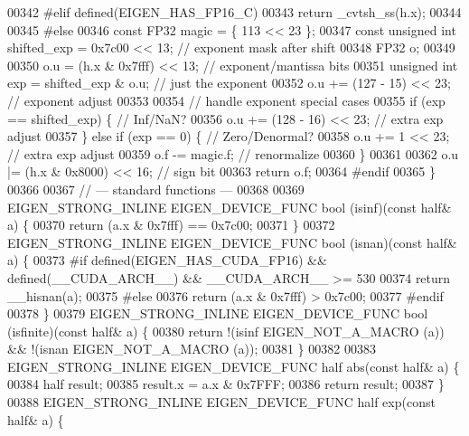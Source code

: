\begin{DoxyCode}
00342 \textcolor{preprocessor}{#elif defined(EIGEN\_HAS\_FP16\_C)}
00343   \textcolor{keywordflow}{return} \_cvtsh\_ss(h.x);
00344 
00345 \textcolor{preprocessor}{#else}
00346   \textcolor{keyword}{const} FP32 magic = \{ 113 << 23 \};
00347   \textcolor{keyword}{const} \textcolor{keywordtype}{unsigned} \textcolor{keywordtype}{int} shifted\_exp = 0x7c00 << 13; \textcolor{comment}{// exponent mask after shift}
00348   FP32 o;
00349 
00350   o.u = (h.x & 0x7fff) << 13;             \textcolor{comment}{// exponent/mantissa bits}
00351   \textcolor{keywordtype}{unsigned} \textcolor{keywordtype}{int} exp = shifted\_exp & o.u;   \textcolor{comment}{// just the exponent}
00352   o.u += (127 - 15) << 23;                \textcolor{comment}{// exponent adjust}
00353 
00354   \textcolor{comment}{// handle exponent special cases}
00355   \textcolor{keywordflow}{if} (exp == shifted\_exp) \{     \textcolor{comment}{// Inf/NaN?}
00356     o.u += (128 - 16) << 23;    \textcolor{comment}{// extra exp adjust}
00357   \} \textcolor{keywordflow}{else} \textcolor{keywordflow}{if} (exp == 0) \{        \textcolor{comment}{// Zero/Denormal?}
00358     o.u += 1 << 23;             \textcolor{comment}{// extra exp adjust}
00359     o.f -= magic.f;             \textcolor{comment}{// renormalize}
00360   \}
00361 
00362   o.u |= (h.x & 0x8000) << 16;    \textcolor{comment}{// sign bit}
00363   \textcolor{keywordflow}{return} o.f;
00364 \textcolor{preprocessor}{#endif}
00365 \}
00366 
00367 \textcolor{comment}{// --- standard functions ---}
00368 
00369 EIGEN\_STRONG\_INLINE EIGEN\_DEVICE\_FUNC bool (isinf)(\textcolor{keyword}{const} half& a) \{
00370   \textcolor{keywordflow}{return} (a.x & 0x7fff) == 0x7c00;
00371 \}
00372 EIGEN\_STRONG\_INLINE EIGEN\_DEVICE\_FUNC bool (isnan)(\textcolor{keyword}{const} half& a) \{
00373 \textcolor{preprocessor}{#if defined(EIGEN\_HAS\_CUDA\_FP16) && defined(\_\_CUDA\_ARCH\_\_) && \_\_CUDA\_ARCH\_\_ >= 530}
00374   \textcolor{keywordflow}{return} \_\_hisnan(a);
00375 \textcolor{preprocessor}{#else}
00376   \textcolor{keywordflow}{return} (a.x & 0x7fff) > 0x7c00;
00377 \textcolor{preprocessor}{#endif}
00378 \}
00379 EIGEN\_STRONG\_INLINE EIGEN\_DEVICE\_FUNC bool (isfinite)(\textcolor{keyword}{const} half& a) \{
00380   \textcolor{keywordflow}{return} !(isinf EIGEN\_NOT\_A\_MACRO (a)) && !(isnan EIGEN\_NOT\_A\_MACRO (a));
00381 \}
00382 
00383 EIGEN\_STRONG\_INLINE EIGEN\_DEVICE\_FUNC half abs(\textcolor{keyword}{const} half& a) \{
00384   half result;
00385   result.x = a.x & 0x7FFF;
00386   \textcolor{keywordflow}{return} result;
00387 \}
00388 EIGEN\_STRONG\_INLINE EIGEN\_DEVICE\_FUNC half exp(\textcolor{keyword}{const} half& a) \{

\end{DoxyCode}

